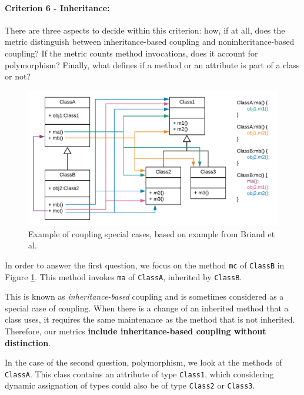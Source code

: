\paragraph{Criterion 6 - Inheritance:}
There are three aspects to decide within this criterion: how, if at all, does the metric distinguish between inheritance-based coupling and noninheritance-based coupling? If the metric counts method invocations, does it account for polymorphism? Finally, what defines if a method or an attribute is part of a class or not?

\begin{figure}[ht]
\begin{center}
\includegraphics[width=\textwidth]{figures/specialcases.png}
\caption{Example of coupling special cases, based on example from Briand et al. \cite{briand1999unified}}
\label{fig:specialcases}
\end{center}
\end{figure}

In order to answer the first question, we focus on the method \texttt{mc} of \texttt{ClassB} in Figure \ref{fig:specialcases}. This method invokes \texttt{ma} of \texttt{ClassA}, inherited by \texttt{ClassB}.

This is known as \textit{inheritance-based} coupling and is sometimes considered as a special case of coupling.
When there is a change of an inherited method that a class uses, it requires the same maintenance as the method that is not inherited. Therefore, our metrics  \textbf{include inheritance-based coupling without distinction}.

In the case of the second question, polymorphism, we look at the methods of \texttt{ClassA}. This class contains an attribute of type \texttt{Class1}, which considering dynamic assignation of types could also be of type \texttt{Class2} or \texttt{Class3}.

